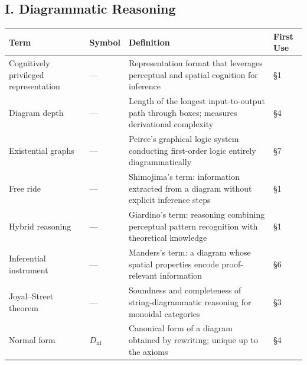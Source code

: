 \documentclass[
]{article}
\newcounter{none} %
\numberwithin{equation}{section}
\begin{document}
\subsection{I. Diagrammatic Reasoning}\label{i.-diagrammatic-reasoning}

{\def\LTcaptype{none} %
\begin{longtable}[]{@{}
  >{\raggedright\arraybackslash}p{}
  >{\centering\arraybackslash}p{}
  >{\raggedright\arraybackslash}p{}
  >{\centering\arraybackslash}p{}@{}}
\toprule\noalign{}
\begin{minipage}[b]{\linewidth}\raggedright
Term
\end{minipage} & \begin{minipage}[b]{\linewidth}\centering
Symbol
\end{minipage} & \begin{minipage}[b]{\linewidth}\raggedright
Definition
\end{minipage} & \begin{minipage}[b]{\linewidth}\centering
First Use
\end{minipage} \\
\midrule\noalign{}
\endhead
\bottomrule\noalign{}
\endlastfoot
Cognitively privileged representation & --- & Representation format that
leverages perceptual and spatial cognition for inference & §1 \\
Diagram depth & --- & Length of the longest input-to-output path through
boxes; measures derivational complexity & §4 \\
Existential graphs & --- & Peirce's graphical logic system conducting
first-order logic entirely diagrammatically & §7 \\
Free ride & --- & Shimojima's term: information extracted from a diagram
without explicit inference steps & §1 \\
Hybrid reasoning & --- & Giardino's term: reasoning combining perceptual
pattern recognition with theoretical knowledge & §1 \\
Inferential instrument & --- & Manders's term: a diagram whose spatial
properties encode proof-relevant information & §6 \\
Joyal--Street theorem & --- & Soundness and completeness of
string-diagrammatic reasoning for monoidal categories & §3 \\
Normal form & \(D_{\text{nf}}\) & Canonical form of a diagram obtained
by rewriting; unique up to the axioms & §4 \\
\end{longtable}
}
\end{document}
